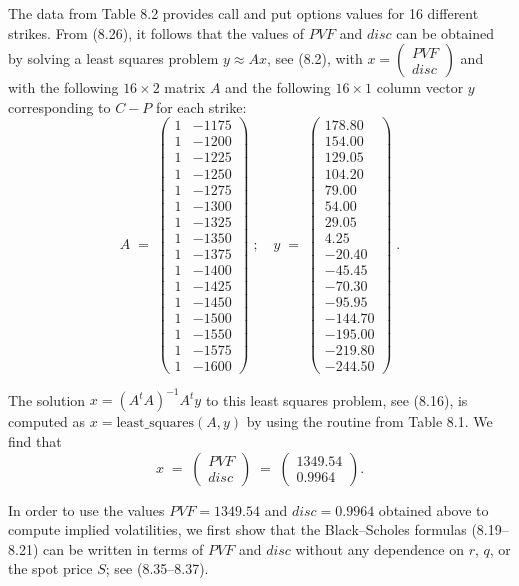 The data from Table 8.2 provides call and put options values for 16 different strikes.
From (8.26), it follows that the values of $PVF$ and $disc$ can be obtained by solving
a least squares problem $y \approx Ax$, see (8.2), with
$x = \begin{pmatrix} PVF \\ disc \end{pmatrix}$ and with the following $16 \times 2$
matrix $A$ and the following $16 \times 1$ column vector $y$ corresponding to $C - P$
for each strike:
\[
A \;=\;
\begin{pmatrix}
1 & -1175 \\
1 & -1200 \\
1 & -1225 \\
1 & -1250 \\
1 & -1275 \\
1 & -1300 \\
1 & -1325 \\
1 & -1350 \\
1 & -1375 \\
1 & -1400 \\
1 & -1425 \\
1 & -1450 \\
1 & -1500 \\
1 & -1550 \\
1 & -1575 \\
1 & -1600
\end{pmatrix}
\;;
\quad
y \;=\;
\begin{pmatrix}
178.80 \\
154.00 \\
129.05 \\
104.20 \\
79.00 \\
54.00 \\
29.05 \\
4.25 \\
-20.40 \\
-45.45 \\
-70.30 \\
-95.95 \\
-144.70 \\
-195.00 \\
-219.80 \\
-244.50
\end{pmatrix}
\;.
\]

The solution $x = (A^tA)^{-1}A^ty$ to this least squares problem, see (8.16), is
computed as $x = \text{least\_squares}(A,y)$ by using the routine from Table 8.1. We
find that
\begin{equation}
x \;=\; \begin{pmatrix} PVF \\ disc \end{pmatrix} \;=\; \begin{pmatrix} 1349.54 \\
0.9964 \end{pmatrix}.
\end{equation}

In order to use the values $PVF = 1349.54$ and $disc = 0.9964$ obtained above to
compute implied volatilities, we first show that the Black--Scholes formulas
(8.19--8.21) can be written in terms of $PVF$ and $disc$ without any dependence on $r$,
$q$, or the spot price $S$; see (8.35--8.37).
